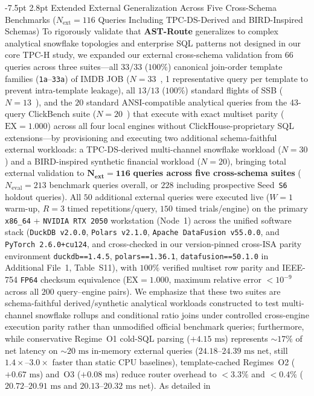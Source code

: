 \documentclass[10pt,a4paper]{article}
\makeatletter
\renewcommand\subsection{\@startsection{subsection}{2}{\z@}%
  {-7.5pt \@plus -2pt \@minus -1pt}%
  {2.8pt \@plus 1pt}%
  {\normalfont\normalsize\bfseries}}
\makeatother
\begin{document}
\subsection{Extended External Generalization Across Five Cross-Schema Benchmarks (\texorpdfstring{$N_{\text{ext}}=116$}{Next=116} Queries Including TPC-DS-Derived and BIRD-Inspired Schemas)}
\label{sec:v9_sec3_5_tpcds_bird_external_validation}
\label{sec:v9_external_130_validation}
To rigorously validate that \textbf{AST-Route} generalizes to complex analytical snowflake topologies and enterprise SQL patterns not designed in our core TPC-H study, we expanded our external cross-schema validation from $66$ queries across three suites---all $33/33$ ($100\%$) canonical join-order template families (\texttt{1a}--\texttt{33a}) of IMDB JOB ($N=33$~\cite{leis2015job}, 1 representative query per template to prevent intra-template leakage), all $13/13$ ($100\%$) standard flights of SSB ($N=13$~\cite{oneil2009ssb}), and the $20$ standard ANSI-compatible analytical queries from the 43-query ClickBench suite ($N=20$~\cite{clickbench2022}) that execute with exact multiset parity ($\text{EX}=1.000$) across all four local engines without ClickHouse-proprietary SQL extensions---by provisioning and executing two additional schema-faithful external workloads: a TPC-DS-derived multi-channel snowflake workload ($N=30$) and a BIRD-inspired synthetic financial workload ($N=20$), bringing total external validation to $\mathbf{N_{\text{ext}}=116}$ \textbf{queries across five cross-schema suites} ($N_{\text{eval}}=213$ benchmark queries overall, or $228$ including prospective Seed~\texttt{S6} holdout queries). All $50$ additional external queries were executed live ($W=1$ warm-up, $R=3$ timed repetitions/query, $150$ timed trials/engine) on the primary \texttt{x86\_64} + \texttt{NVIDIA RTX 2050} workstation (Node~1) across the unified software stack (\texttt{DuckDB v2.0.0}, \texttt{Polars v2.1.0}, \texttt{Apache DataFusion v55.0.0}, and \texttt{PyTorch 2.6.0+cu124}, and cross-checked in our version-pinned cross-ISA parity environment \texttt{duckdb==1.4.5}, \texttt{polars==1.36.1}, \texttt{datafusion==50.1.0} in Additional File~1, Table~S11), with $100\%$ verified multiset row parity and IEEE-754 \texttt{FP64} checksum equivalence ($\text{EX}=1.000$, maximum relative error $< 10^{-9}$ across all $200$ query--engine pairs). We emphasize that these two suites are schema-faithful derived/synthetic analytical workloads constructed to test multi-channel snowflake rollups and conditional ratio joins under controlled cross-engine execution parity rather than unmodified official benchmark queries; furthermore, while conservative Regime~O1 cold-SQL parsing ($+4.15\text{ ms}$) represents $\sim 17\%$ of net latency on $\sim 20\text{ ms}$ in-memory external queries ($24.18\text{--}24.39\text{ ms}$ net, still $1.4\times\text{--}3.0\times$ faster than static CPU baselines), template-cached Regimes~O2 ($+0.67\text{ ms}$) and~O3 ($+0.08\text{ ms}$) reduce router overhead to $<3.3\%$ and $<0.4\%$ ($20.72\text{--}20.91\text{ ms}$ and $20.13\text{--}20.32\text{ ms}$ net). As detailed in 
\end{document}
